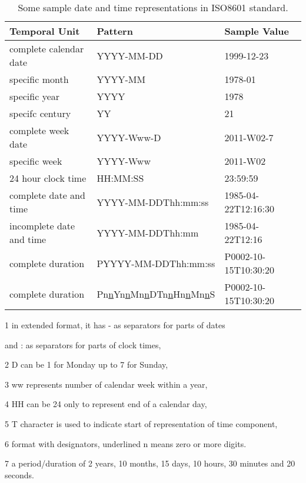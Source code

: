 \begin{table}[H]
	\centering
	\begin{threeparttable}
	\begin{tabular}{||l l l||} 
		\hline
		\textbf{Temporal Unit} & \textbf{Pattern} & \textbf{Sample Value} \\ [0.5ex] 
		\hline\hline
		complete calendar date & YYYY-MM-DD\tnote{1} & 1999-12-23 \\ 
		specific month & YYYY-MM & 1978-01 \\
		specific year & YYYY & 1978 \\
		specifc century & YY & 21 \\
		complete week date & YYYY-Www-D\tnote{2} & 2011-W02-7\\
		specific week & YYYY-Www\tnote{3} & 2011-W02 \\
		24 hour clock time & HH:MM:SS\tnote{4} & 23:59:59 \\
		complete date and time & YYYY-MM-DDThh:mm:ss\tnote{5} & 1985-04-22T12:16:30 \\
		incomplete date and time & YYYY-MM-DDThh:mm & 1985-04-22T12:16 \\
		complete duration & PYYYY-MM-DDThh:mm:ss & P0002-10-15T10:30:20 \\
		complete duration\tnote{6} & Pn\underline{n}Yn\underline{n}Mn\underline{n}DTn\underline{n}Hn\underline{n}Mn\underline{n}S & P0002-10-15T10:30:20\tnote{7} \\		
		\hline
	\end{tabular}
	\begin{tablenotes}
		\item[1] in extended format, it has - as separators for parts of dates \par and : as separators for parts of clock times,
		\item[2] D can be 1 for Monday up to 7 for Sunday,
		\item[3] ww represents number of calendar week within a year,
		\item[4] HH can be 24 only to represent end of a calendar day,
		\item[5] T character is used to indicate start of representation of time component,
		\item[6] format with designators, underlined n means zero or more digits.
		\item[7] a period/duration of 2 years, 10 months, 15 days, 10 hours, 30 minutes	and 20 seconds.
	\end{tablenotes}
	\end{threeparttable}
	\caption{Some sample date and time representations in ISO8601 standard.}
	\label{table:1a}
\end{table}

